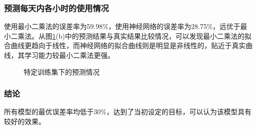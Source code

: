 \documentclass[CJK]{ctexart}
\begin{document}
\subsubsection{预测每天内各小时的使用情况}
使用最小二乘法的误差率为59.98\%，使用神经网络的误差率为28.75\%，远优于最小二乘法。从图\ref{fig:loss_2}(b)中的预测结果与真实结果比较情况，可以发现最小二乘法的拟合曲线更趋向于线性，而神经网络的拟合曲线则是明显是非线性的，贴近于真实曲线，其学习能力较最小二乘法更强。
\begin{figure}[htbp]
    \centering
    \centering
    \caption{特定训练集下的预测情况}
    \label{fig:loss_2}
\end{figure}
\subsubsection{结论}
所有模型的最优误差率均低于30\%，达到了当初设定的目标，可以认为该模型具有较好的效果。
\end{document}
